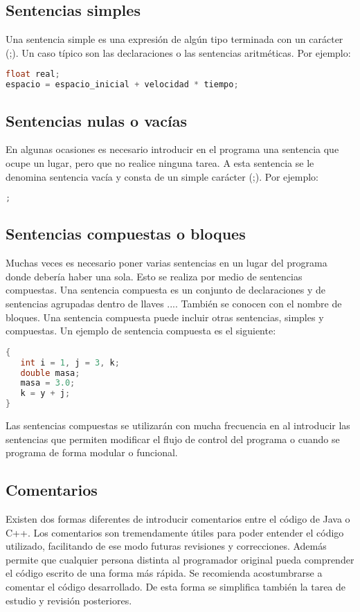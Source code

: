 \subsection{Sentencias simples}
Una sentencia simple es una expresión de algún tipo terminada con un carácter (;). Un caso
típico son las declaraciones o las sentencias aritméticas. Por ejemplo:

\begin{lstlisting}[language=C++]
float real;
espacio = espacio_inicial + velocidad * tiempo;
\end{lstlisting}

\subsection{Sentencias nulas o vacías}

En algunas ocasiones es necesario introducir en el programa una sentencia que ocupe un
lugar, pero que no realice ninguna tarea. A esta sentencia se le denomina sentencia vacía y
consta de un simple carácter (;). Por ejemplo:

\begin{lstlisting}[language=C++]
;
\end{lstlisting}

\subsection{Sentencias compuestas o bloques}
Muchas veces es necesario poner varias sentencias en un lugar del programa donde debería
haber una sola. Esto se realiza por medio de sentencias compuestas. Una sentencia compuesta
es un conjunto de declaraciones y de sentencias agrupadas dentro de llaves {...}. También
se conocen con el nombre de bloques. Una sentencia compuesta puede incluir otras
sentencias, simples y compuestas. Un ejemplo de sentencia compuesta es el siguiente:

\begin{lstlisting}[language=C++]
{
   int i = 1, j = 3, k;
   double masa;
   masa = 3.0;
   k = y + j;
}
\end{lstlisting}

Las sentencias compuestas se utilizarán con mucha frecuencia en al
introducir las sentencias que permiten modificar el flujo de control del programa o cuando se programa de forma modular o funcional.

\subsection{Comentarios}
Existen dos formas diferentes de introducir comentarios entre el código de Java o C++. Los
comentarios son tremendamente útiles para poder entender el código utilizado, facilitando de ese
modo futuras revisiones y correcciones. Además permite que cualquier persona distinta al
programador original pueda comprender el código escrito de una forma más rápida. Se recomienda
acostumbrarse a comentar el código desarrollado. De esta forma se simplifica también la tarea de
estudio y revisión posteriores.

